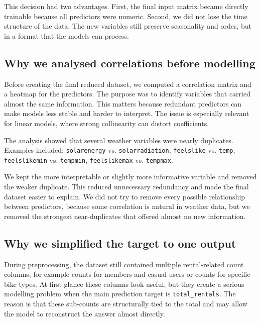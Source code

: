 \documentclass[conference]{IEEEtran}
\begin{document}
This decision had two advantages. First, the final input matrix became directly trainable because 
all predictors were numeric. Second, we did not lose the time structure of the data. The new variables 
still preserve seasonality and order, but in a format that the models can process.

\subsection{Why we analysed correlations before modelling}
Before creating the final reduced dataset, we computed a correlation matrix and a heatmap for the 
predictors. The purpose was to identify variables that carried almost the same information. 
This matters because redundant predictors can make models less stable and harder to interpret. 
The issue is especially relevant for linear models, where strong collinearity can distort coefficients.

The analysis showed that several weather variables were nearly duplicates. Examples included:\newline
\texttt{solarenergy} vs. \texttt{solarradiation},\newline
\texttt{feelslike} vs. \texttt{temp},\newline
\texttt{feelslikemin} vs. \texttt{tempmin},\newline
\texttt{feelslikemax} vs. \texttt{tempmax}.

We kept the more interpretable or slightly more informative variable and removed the weaker duplicate. 
This reduced unnecessary redundancy and made the final dataset easier to explain. We did not try to 
remove every possible relationship between predictors, because some correlation is natural in weather 
data, but we removed the strongest near-duplicates that offered almost no new information.

\subsection{Why we simplified the target to one output}
During preprocessing, the dataset still contained multiple rental-related count columns, for example 
counts for members and casual users or counts for specific bike types. At first glance these columns 
look useful, but they create a serious modelling problem when the main prediction target 
is \texttt{total\_rentals}. The reason is that these sub-counts are structurally tied to the 
total and may allow the model to reconstruct the answer almost directly.
\end{document}
